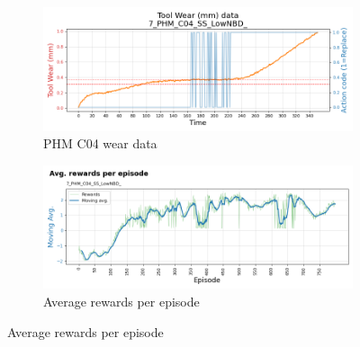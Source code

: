 \documentclass[a4paper, 12pt]{article}
\begin{document}
\begin{figure}[ht]
	\begin{subfigure}[b]{0.5\textwidth}
		\centering
		\includegraphics[width=\textwidth]{images/TrainingPlots/7_PHM_C04_SS_LowNBD__wear_plot.png}  
		\caption{PHM C04 wear data}
		\label{fig:C04wear}
	\end{subfigure}
	\hfill
	\begin{subfigure}[b]{0.5\textwidth}
		\centering
		\includegraphics[width=\textwidth]{images/TrainingPlots/7_PHM_C04_SS_LowNBD__Avg_episode_rewards.png}  
		\caption{Average rewards per episode}
		\label{fig:C04rewards}
	\end{subfigure} \par\bigskip
	

\end{figure}
\end{document}
